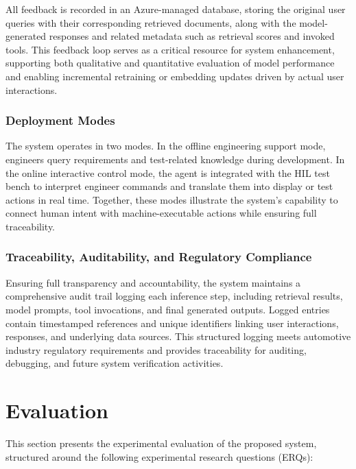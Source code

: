 \documentclass[a4paper,fleqn]{cas-dc}
\renewcommand{\textit}[1]{#1}
\begin{document}
All feedback is recorded in an Azure-managed database, storing the original user queries with their corresponding retrieved documents, along with the model-generated responses and related metadata such as retrieval scores and invoked tools. This feedback loop serves as a critical resource for system enhancement, supporting both qualitative and quantitative evaluation of model performance and enabling incremental retraining or embedding updates driven by actual user interactions.

\subsubsection{Deployment Modes} 
The system operates in two modes. In the \textit{offline engineering support mode}, engineers query requirements and test-related knowledge during development. In the \textit{online interactive control mode}, the agent is integrated with the HIL test bench to interpret engineer commands and translate them into display or test actions in real time. Together, these modes illustrate the system’s capability to connect human intent with machine-executable actions while ensuring full traceability.

\subsubsection{Traceability, Auditability, and Regulatory Compliance}
Ensuring full transparency and accountability, the system maintains a comprehensive audit trail logging each inference step, including retrieval results, model prompts, tool invocations, and final generated outputs. Logged entries contain timestamped references and unique identifiers linking user interactions, responses, and underlying data sources. This structured logging meets automotive industry regulatory requirements and provides traceability for auditing, debugging, and future system verification activities.


\section{Evaluation}
\label{sec:evaluation}

This section presents the experimental evaluation of the proposed system, structured around the following experimental research questions (ERQs):
\end{document}
